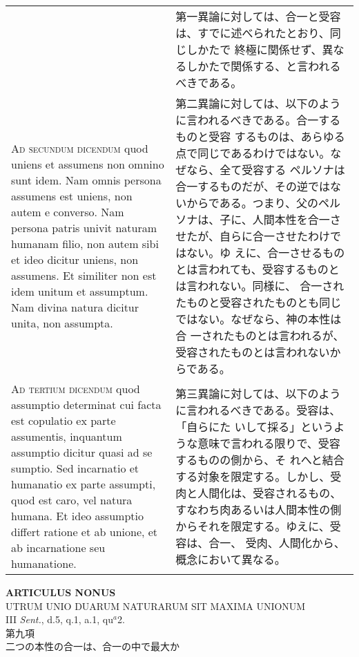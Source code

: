 \documentclass[10pt]{jsarticle} %
\begin{document}
\begin{longtable}{p{21em}p{21em}}
&

第一異論に対しては、合一と受容は、すでに述べられたとおり、同じしかたで
終極に関係せず、異なるしかたで関係する、と言われるべきである。


\\



{\scshape Ad secundum dicendum} quod uniens et assumens non omnino
sunt idem. Nam omnis persona assumens est uniens, non autem e
converso. Nam persona patris univit naturam humanam filio, non autem
sibi et ideo dicitur uniens, non assumens. Et similiter non est idem
unitum et assumptum. Nam divina natura dicitur unita, non assumpta.


&

第二異論に対しては、以下のように言われるべきである。合一するものと受容
するものは、あらゆる点で同じであるわけではない。なぜなら、全て受容する
ペルソナは合一するものだが、その逆ではないからである。つまり、父のペル
ソナは、子に、人間本性を合一させたが、自らに合一させたわけではない。ゆ
えに、合一させるものとは言われても、受容するものとは言われない。同様に、
合一されたものと受容されたものとも同じではない。なぜなら、神の本性は合
一されたものとは言われるが、受容されたものとは言われないからである。


\\



{\scshape Ad tertium dicendum} quod assumptio determinat cui facta est
copulatio ex parte assumentis, inquantum assumptio dicitur quasi ad se
sumptio. Sed incarnatio et humanatio ex parte assumpti, quod est caro,
vel natura humana. Et ideo assumptio differt ratione et ab unione, et
ab incarnatione seu humanatione.


&


第三異論に対しては、以下のように言われるべきである。受容は、「自らにた
いして採る」というような意味で言われる限りで、受容するものの側から、そ
れへと結合する対象を限定する。しかし、受肉と人間化は、受容されるもの、
すなわち肉あるいは人間本性の側からそれを限定する。ゆえに、受容は、合一、
受肉、人間化から、概念において異なる。

\\



\end{longtable}
\newpage



\begin{center}
{\Large {\bf ARTICULUS NONUS}}\\ {\large UTRUM UNIO DUARUM NATURARUM
SIT MAXIMA UNIONUM}\\ {\footnotesize III {\itshape Sent.}, d.5, q.1,
a.1, qu$^a$2.}\\ {\Large 第九項\\二つの本性の合一は、合一の中で最大か}
\end{center}
\end{document}
